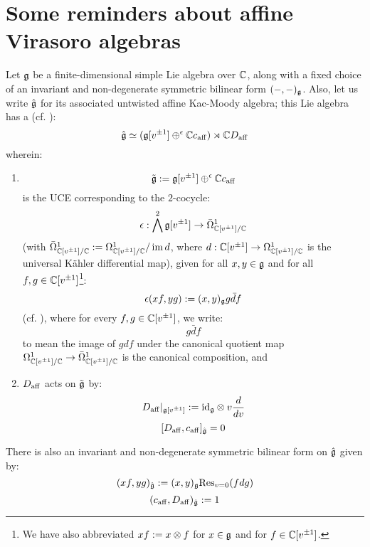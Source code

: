     \section{Some reminders about affine Virasoro algebras}
        Let $\mathfrak{g}$ be a finite-dimensional simple Lie algebra over $\mathbb{C}$, along with a fixed choice of an invariant and non-degenerate symmetric bilinear form $(-, -)_{\mathfrak{g}}$. Also, let us write $\hat{\mathfrak{g}}$ for its associated untwisted affine Kac-Moody algebra; this Lie algebra has a  (cf. \cite[Chapter 7]{kac_infinite_dimensional_lie_algebras}):
            $$\hat{\mathfrak{g}} \simeq ( \mathfrak{g}[v^{\pm 1}] \oplus^{\epsilon} \mathbb{C} c_{\mathrm{aff}} ) \rtimes \mathbb{C} D_{\mathrm{aff}}$$
        wherein:
        \begin{enumerate}
            \item
                $$\tilde{\mathfrak{g}} := \mathfrak{g}[v^{\pm 1}] \oplus^{\epsilon} \mathbb{C} c_{\mathrm{aff}}$$
            is the UCE corresponding to the $2$-cocycle:
                $$\epsilon: \bigwedge^2 \mathfrak{g}[v^{\pm 1}] \to \bar{\Omega}^1_{\mathbb{C}[v^{\pm 1}]/\mathbb{C}}$$
            (with $\bar{\Omega}^1_{\mathbb{C}[v^{\pm 1}]/\mathbb{C}} := \Omega^1_{\mathbb{C}[v^{\pm 1}]/\mathbb{C}}/\operatorname{im} d$, where $d: \mathbb{C}[v^{\pm 1}] \to \Omega^1_{\mathbb{C}[v^{\pm 1}]/\mathbb{C}}$ is the universal K\"ahler differential map), given for all $x, y \in \mathfrak{g}$ and for all $f, g \in \mathbb{C}[v^{\pm 1}]$\footnote{We have also abbreviated $xf := x \tensor f$ for $x \in \mathfrak{g}$ and for $f \in \mathbb{C}[v^{\pm 1}]$.}:
                $$\epsilon(xf, yg) := (x, y)_{\mathfrak{g}} g\bar{d}f$$
            (cf. \cite{kassel_universal_central_extensions_of_lie_algebras}), where for every $f, g \in \mathbb{C}[v^{\pm 1}]$, we write:
                $$g\bar{d}f$$
            to mean the image of $gdf$ under the canonical quotient map $\Omega^1_{\mathbb{C}[v^{\pm 1}]/\mathbb{C}} \to \bar{\Omega}^1_{\mathbb{C}[v^{\pm 1}]/\mathbb{C}}$ is the canonical composition, and
            \item $D_{\mathrm{aff}}$ acts on $\tilde{\mathfrak{g}}$ by:
                $$D_{\aff}|_{\g[v^{\pm 1}]} := \id_{\g} \tensor v \frac{d}{dv}$$
                $$[D_{\mathrm{aff}}, c_{\mathrm{aff}}]_{\hat{\mathfrak{g}}} = 0$$
        \end{enumerate}
        There is also an invariant and non-degenerate symmetric bilinear form on $\hat{\mathfrak{g}}$ given by:
            $$(xf, yg)_{\hat{\mathfrak{g}}} := (x, y)_{\mathfrak{g}} \mathrm{Res}_{v = 0}(f dg)$$
            $$(c_{\mathrm{aff}}, D_{\mathrm{aff}})_{\hat{\mathfrak{g}}} := 1$$

